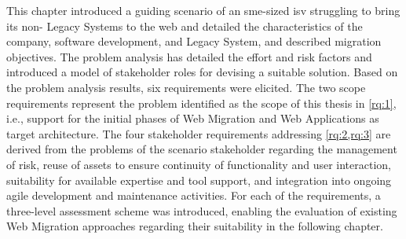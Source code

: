 This chapter introduced a guiding scenario of an \gls{sme}-sized \gls{isv} struggling to bring its non- \glspl{Legacy System} to the \gls{web} and detailed the characteristics of the company, software development, and \gls{Legacy System}, and described migration objectives.
The problem analysis has detailed the effort and risk factors and introduced a model of stakeholder roles for devising a suitable solution.
Based on the problem analysis results, six requirements were elicited. 
The two scope requirements represent the problem identified as the scope of this thesis in \cref{rq:1}, i.e., support for the initial phases of \gls{Web Migration} and \glspl{Web Application} as target architecture.
The four stakeholder requirements addressing \cref{rq:2,rq:3} are derived from the problems of the scenario stakeholder regarding the management of risk, reuse of  assets to ensure continuity of functionality and user interaction, suitability for available expertise and tool support, and integration into ongoing agile development and maintenance activities.
For each of the requirements, a three-level assessment scheme was introduced, enabling the evaluation of existing \gls{Web Migration} approaches regarding their suitability in the following chapter.
